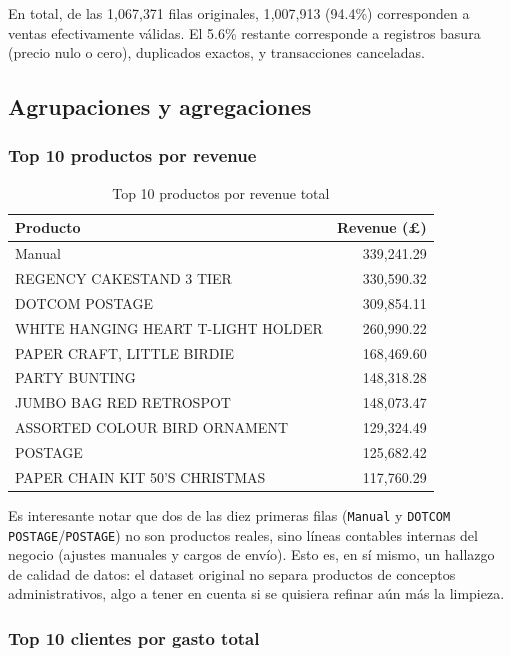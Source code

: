En total, de las 1{,}067{,}371 filas originales, 1{,}007{,}913 (94.4\%) corresponden a ventas efectivamente válidas. El 5.6\% restante corresponde a registros basura (precio nulo o cero), duplicados exactos, y transacciones canceladas.

\subsection{Agrupaciones y agregaciones}

\subsubsection*{Top 10 productos por revenue}

\begin{table}[H]
\centering
\small
\begin{tabular}{lr}
\toprule
\textbf{Producto} & \textbf{Revenue (£)} \\
\midrule
Manual & 339{,}241.29 \\
REGENCY CAKESTAND 3 TIER & 330{,}590.32 \\
DOTCOM POSTAGE & 309{,}854.11 \\
WHITE HANGING HEART T-LIGHT HOLDER & 260{,}990.22 \\
PAPER CRAFT, LITTLE BIRDIE & 168{,}469.60 \\
PARTY BUNTING & 148{,}318.28 \\
JUMBO BAG RED RETROSPOT & 148{,}073.47 \\
ASSORTED COLOUR BIRD ORNAMENT & 129{,}324.49 \\
POSTAGE & 125{,}682.42 \\
PAPER CHAIN KIT 50'S CHRISTMAS & 117{,}760.29 \\
\bottomrule
\end{tabular}
\caption{Top 10 productos por revenue total}
\end{table}

Es interesante notar que dos de las diez primeras filas (\texttt{Manual} y \texttt{DOTCOM POSTAGE}/\texttt{POSTAGE}) no son productos reales, sino líneas contables internas del negocio (ajustes manuales y cargos de envío). Esto es, en sí mismo, un hallazgo de calidad de datos: el dataset original no separa productos de conceptos administrativos, algo a tener en cuenta si se quisiera refinar aún más la limpieza.

\subsubsection*{Top 10 clientes por gasto total}


